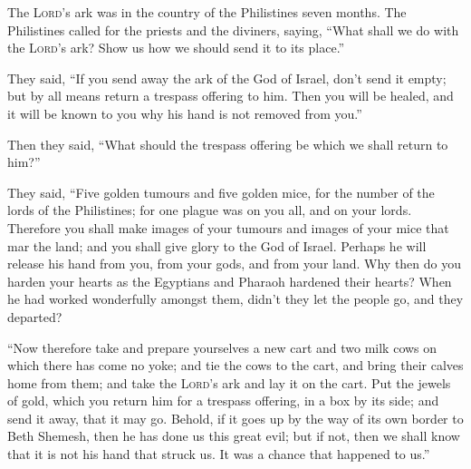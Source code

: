  The \textsc{Lord}'s ark was in the country of the
Philistines seven months.  The Philistines called for the
priests and the diviners, saying, ``What shall we do with the
\textsc{Lord}'s ark? Show us how we should send it to its place.''

 They said, ``If you send away the ark of the God of
Israel, don't send it empty; but by all means return a trespass offering
to him. Then you will be healed, and it will be known to you why his
hand is not removed from you.''

 Then they said, ``What should the trespass offering be
which we shall return to him?''

They said, ``Five golden tumours and five golden mice, for the number of
the lords of the Philistines; for one plague was on you all, and on your
lords.  Therefore you shall make images of your tumours
and images of your mice that mar the land; and you shall give glory to
the God of Israel. Perhaps he will release his hand from you, from your
gods, and from your land.  Why then do you harden your
hearts as the Egyptians and Pharaoh hardened their hearts? When he had
worked wonderfully amongst them, didn't they let the people go, and they
departed?

 ``Now therefore take and prepare yourselves a new cart
and two milk cows on which there has come no yoke; and tie the cows to
the cart, and bring their calves home from them;  and take
the \textsc{Lord}'s ark and lay it on the cart. Put the jewels of gold,
which you return him for a trespass offering, in a box by its side; and
send it away, that it may go.  Behold, if it goes up by
the way of its own border to Beth Shemesh, then he has done us this
great evil; but if not, then we shall know that it is not his hand that
struck us. It was a chance that happened to us.''

